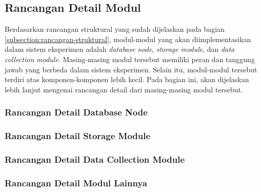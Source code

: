 \newpage
\subsection{Rancangan Detail Modul}
\label{subsection:detail-modul}

Berdasarkan rancangan struktural yang sudah dijelaskan pada bagian \ref{subsection:rancangan-struktural}, modul-modul yang akan diimplementasikan dalam sistem eksperimen adalah \textit{database node}, \textit{storage module}, dan \textit{data collection module}. Masing-masing modul tersebut memiliki peran dan tanggung jawab yang berbeda dalam sistem eksperimen. Selain itu, modul-modul tersebut terdiri atas komponen-komponen lebih kecil. Pada bagian ini, akan dijelaskan lebih lanjut mengenai rancangan detail dari masing-masing modul tersebut.

\subsubsection{Rancangan Detail Database Node}
\label{subsubsection:detail-database-node}



\subsubsection{Rancangan Detail Storage Module}
\label{subsubsection:detail-storage-module}

\subsubsection{Rancangan Detail Data Collection Module}
\label{subsubsection:detail-data-collection-module}

\subsubsection{Rancangan Detail Modul Lainnya}
\label{subsubsection:detail-other-modules}

